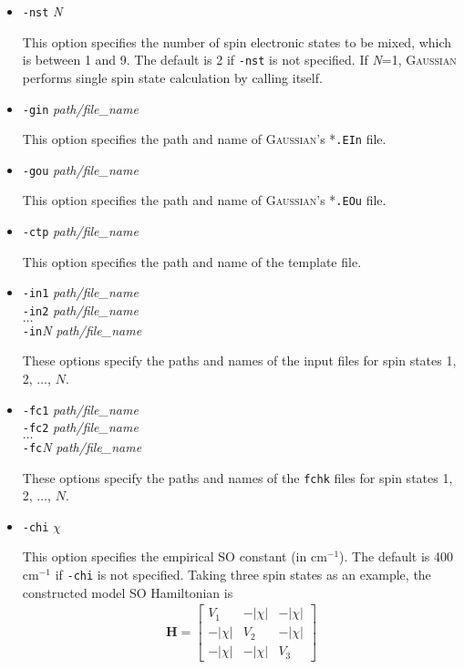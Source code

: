 \documentclass[UTF8]{article}
\begin{document}
\begin{itemize}[leftmargin= 0 pt]
\item \verb|-nst| \textit{N}

This option specifies the number of spin electronic states to be mixed, which is between 1 and 9.
 The default is 2 if \verb|-nst| is not specified.
 If \textit{N}=1, \textsc{Gaussian} performs single spin state calculation by calling itself.

\item \verb|-gin| \textit{path/file\_name}

This option specifies the path and name of \textsc{Gaussian}'s *\verb|.EIn| file.

\item \verb|-gou| \textit{path/file\_name}

This option specifies the path and name of \textsc{Gaussian}'s *\verb|.EOu| file.

\item \verb|-ctp| \textit{path/file\_name}

This option specifies the path and name of the template file.

\item \verb|-in1| \textit{path/file\_name} \\
 \verb|-in2| \textit{path/file\_name} \\
 $\ldots$ \\
 \verb|-in|\textit{N} \textit{path/file\_name}

These options specify the paths and names of the input files for spin states 1, 2, $\ldots$, $N$.

\item \verb|-fc1| \textit{path/file\_name} \\
 \verb|-fc2| \textit{path/file\_name} \\
 $\ldots$ \\
 \verb|-fc|\textit{N} \textit{path/file\_name}

These options specify the paths and names of the \verb|fchk| files for spin states 1, 2, $\ldots$, $N$.

\item \verb|-chi| \textit{$\chi$}

This option specifies the empirical SO constant (in cm$^{-1}$). The default is 400 cm$^{-1}$ if \verb|-chi| is not specified.
Taking three spin states as an example, the constructed model SO Hamiltonian is
\begin{align}\label{hso0-eq1}
\mathbf{H} = \left[\begin{array}{ccc}
    V_1 & -|\chi| & -|\chi| \\
    -|\chi| & V_2 & -|\chi| \\
    -|\chi| & -|\chi| & V_3
\end{array}\right]
\end{align}


\end{itemize}
\end{document}
